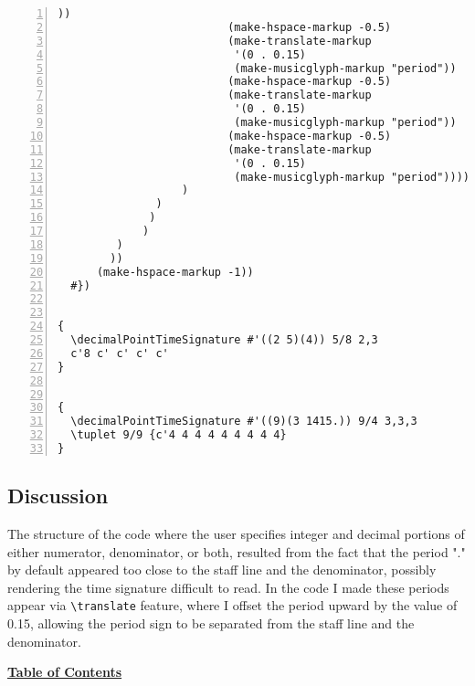 \begin{Verbatim}[numbers=left,xleftmargin=5mm]
                            ))
                          (make-hspace-markup -0.5)
                          (make-translate-markup
                           '(0 . 0.15)
                           (make-musicglyph-markup "period"))
                          (make-hspace-markup -0.5)
                          (make-translate-markup
                           '(0 . 0.15)
                           (make-musicglyph-markup "period"))
                          (make-hspace-markup -0.5)
                          (make-translate-markup
                           '(0 . 0.15)
                           (make-musicglyph-markup "period"))))
                   )
               )
              )
             )
         )
        ))
      (make-hspace-markup -1))
  #})


{
  \decimalPointTimeSignature #'((2 5)(4)) 5/8 2,3
  c'8 c' c' c' c'
}


{
  \decimalPointTimeSignature #'((9)(3 1415.)) 9/4 3,3,3
  \tuplet 9/9 {c'4 4 4 4 4 4 4 4 4}
}
\end{Verbatim}

\subsection{Discussion}
The structure of the code where the user specifies integer and decimal portions of either numerator, denominator, or both, resulted from the fact that the period "." by default appeared too close to the staff line and the denominator, possibly rendering the time signature difficult to read. In the code I made these periods appear via \verb|\translate| feature, where I offset the period upward by the value of 0.15, allowing the period sign to be separated  from the staff line and the denominator. 


\hyperref[sec:toc]{\textbf{Table of Contents}}

\vfill \break


